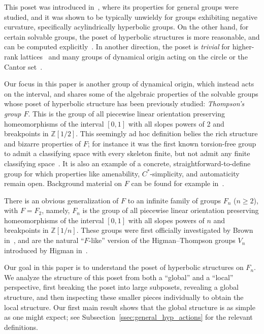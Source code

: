 \documentclass[10pt,a4paper]{article}
\theoremstyle{definition}
\theoremstyle{remark}
\newcommand{\Z}{\mathbb{Z}}
\theoremstyle{plain}
\begin{document}
This poset was introduced in~\cite{ABO}, where its properties for general groups were studied, and it was shown to be typically unwieldy for groups exhibiting negative curvature, specifically acylindrically hyperbolic groups. On the other hand, for certain solvable groups, the poset of hyperbolic structures is more reasonable, and can be computed explicitly~\cite{caprace15, sahana:wreath, AR:BS, confining, ABR2}. In another direction, the poset is \emph{trivial} for higher-rank lattices~\cite{haettel} and many groups of dynamical origin acting on the circle or the Cantor set~\cite{anthony, NL}.

Our focus in this paper is another group of dynamical origin, which instead acts on the interval, and shares some of the algebraic properties of the solvable groups whose poset of hyperbolic structure has been previously studied: \emph{Thompson's group $F$}.
This is the group of all piecewise linear orientation preserving homeomorphisms of the interval $[0,1]$ with all slopes powers of 2 and breakpoints in $\Z[1/2]$. This seemingly ad hoc definition belies the rich structure and bizarre properties of $F$; for instance it was the first known torsion-free group to admit a classifying space with every skeleton finite, but not admit any finite classifying space~\cite{brown84}. It is also an example of a concrete, straightforward-to-define group for which properties like amenability, $C^*$-simplicity, and automaticity remain open. Background material on $F$ can be found for example in~\cite{belk04,cannon96}.

There is an obvious generalization of $F$ to an infinite family of groups $F_n$ ($n\ge 2$), with $F=F_2$, namely, $F_n$ is the group of all piecewise linear orientation preserving homeomorphisms of the interval $[0,1]$ with all slopes powers of $n$ and breakpoints in $\Z[1/n]$. These groups were first officially investigated by Brown in~\cite{brown87}, and are the natural ``$F$-like'' version of the Higman--Thompson groups $V_n$ introduced by Higman in~\cite{higman74}.

Our goal in this paper is to understand the poset of hyperbolic structures on $F_n$. We analyze the structure of this poset from both a ``global'' and a ``local'' perspective, first breaking the poset into large subposets, revealing a global structure, and then inspecting these smaller pieces individually to obtain the local structure. Our first main result shows that the global structure is as simple as one might expect; see Subsection~\ref{ssec:general_hyp_actions} for the relevant definitions.
\end{document}
